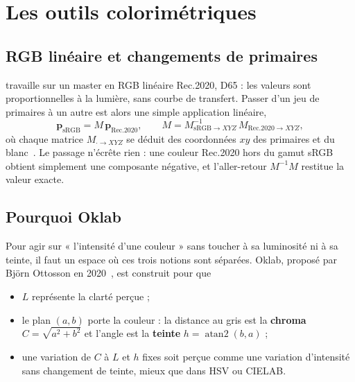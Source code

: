 \chapter{Les outils colorimétriques}

\section{RGB linéaire et changements de primaires}
\IPR{} travaille sur un master en RGB linéaire Rec.2020, D65 : les valeurs sont
proportionnelles à la lumière, sans courbe de transfert. Passer d'un jeu de
primaires à un autre est alors une simple application linéaire,
\begin{equation}
\mathbf{p}_{\text{sRGB}} = M\,\mathbf{p}_{\text{Rec.2020}},\qquad
M = M_{\text{sRGB}\to XYZ}^{-1}\,M_{\text{Rec.2020}\to XYZ},
\end{equation}
où chaque matrice $M_{\cdot\to XYZ}$ se déduit des coordonnées $xy$ des
primaires et du blanc~\cite{itu2020,iec61966}. Le passage n'écrête rien : une
couleur Rec.2020 hors du gamut sRGB obtient simplement une composante négative,
et l'aller-retour $M^{-1}M$ restitue la valeur exacte.


\section{Pourquoi Oklab}
Pour agir sur « l'intensité d'une couleur » sans toucher à sa luminosité ni à
sa teinte, il faut un espace où ces trois notions sont séparées. Oklab,
proposé par Björn Ottosson en 2020~\cite{ottosson2020}, est construit pour que
\begin{itemize}
\item $L$ représente la clarté perçue ;
\item le plan $(a,b)$ porte la couleur : la distance au gris est la
\textbf{chroma} $C=\sqrt{a^2+b^2}$ et l'angle est la \textbf{teinte}
$h=\operatorname{atan2}(b,a)$ ;
\item une variation de $C$ à $L$ et $h$ fixes soit perçue comme une variation
d'intensité sans changement de teinte, mieux que dans HSV ou CIELAB.
\end{itemize}

